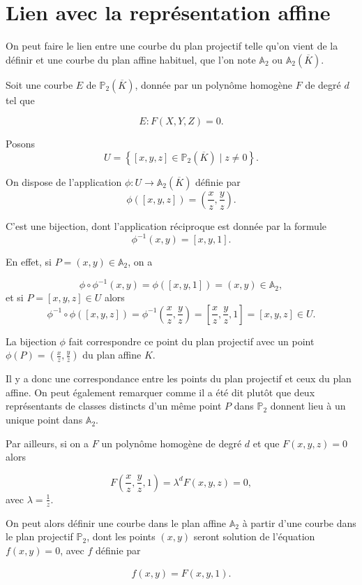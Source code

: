 \section{Lien avec la représentation affine}
On peut faire le lien entre une courbe du plan projectif telle qu'on vient de la définir
et une courbe du plan affine habituel, que l'on note $\mathbb{A}_{2}$ ou
$\mathbb{A}_{2}(\overline{K})$. 

Soit une courbe $E$ de $\mathbb{P}_{2}(\overline{K})$, donnée par un
polynôme homogène $F$ de degré $d$ tel que 

\[
E : F(X,Y,Z)=0
.\] 

Posons 
\[
U = \left\{ [x,y,z] \in \mathbb{P}_{2}(\overline{K}) \mid z \neq 0 \right\} 
.\] 

On dispose de l'application $\phi : U \to \mathbb{A}_{2}(\overline{K})$ définie par
\[
\phi([x,y,z])=\left( \frac{x}{z},\frac{y}{z} \right) 
.\] 

C'est une bijection, dont l'application réciproque est donnée par la formule
\[
\phi^{-1}(x,y)=\left[ x,y,1 \right] 
.\] 

En effet, si $P = (x,y) \in \mathbb{A}_{2}$, on a

\[
\phi \circ \phi^{-1} (x,y) = \phi([x,y,1]) = (x,y) \in \mathbb{A}_{2}
,\] 
et si $P = [x,y,z] \in U$ alors
\[
\phi^{-1} \circ \phi ([x,y,z]) = \phi^{-1}(\frac{x}{z},\frac{y}{z}) = [\frac{x}{z},\frac{y}{z},1] =
[x,y,z] \in U
.\] 

La bijection $\phi$ fait correspondre ce point du plan projectif avec un point
$\phi(P) = (\frac{x}{z},\frac{y}{z})$ du plan affine $K$. 

Il y a donc une correspondance entre les points du plan projectif et ceux du plan affine.
On peut également remarquer comme il a été dit plutôt que deux représentants de classes
distincts d'un même point $P$ dans $\mathbb{P}_{2}$ donnent lieu à un unique point dans
$\mathbb{A}_{2}$.

Par ailleurs, si on a $F$ un polynôme homogène de degré $d$ et que $F(x,y,z) = 0$ alors 

\[
F(\frac{x}{z},\frac{y}{z},1) = \lambda^{d} F(x,y,z) = 0
,\] 
avec $\lambda = \frac{1}{z}$.

On peut alors définir une courbe dans le plan affine $\mathbb{A}_{2}$ à partir d'une
courbe dans le plan projectif $\mathbb{P}_{2}$, dont les points $(x,y)$ seront solution de
l'équation $f(x,y) = 0$, avec $f$ définie par

\begin{align}
    \label{eq:bijectionP2}
    f(x,y) = F(x,y,1)
.\end{align}


